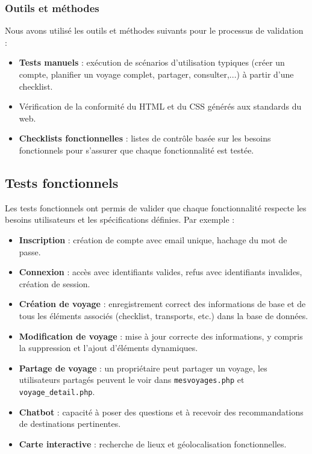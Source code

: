 \documentclass[a4paper,12pt]{article}
\begin{document}
\subsubsection{Outils et méthodes}
Nous avons utilisé les outils et méthodes suivants pour le processus de validation :
\begin{itemize}
  \item \textbf{Tests manuels} : exécution de scénarios d'utilisation typiques (créer un compte, planifier un voyage complet, partager, consulter,...) à partir d'une checklist.
  \item Vérification de la conformité du HTML et du CSS générés aux standards du web.
  \item \textbf{Checklists fonctionnelles} : listes de contrôle basée sur les besoins fonctionnels pour s'assurer que chaque fonctionnalité est testée.
\end{itemize}

\subsection{Tests fonctionnels}
Les tests fonctionnels ont permis de valider que chaque fonctionnalité respecte les besoins utilisateurs et les spécifications définies. Par exemple :
\begin{itemize}
    \item \textbf{Inscription} : création de compte avec email unique, hachage du mot de passe.
    \item \textbf{Connexion} : accès avec identifiants valides, refus avec identifiants invalides, création de session.
    \item \textbf{Création de voyage} : enregistrement correct des informations de base et de tous les éléments associés (checklist, transports, etc.) dans la base de données.
    \item \textbf{Modification de voyage} : mise à jour correcte des informations, y compris la suppression et l'ajout d'éléments dynamiques.
    \item \textbf{Partage de voyage} : un propriétaire peut partager un voyage, les utilisateurs partagés peuvent le voir dans \texttt{mesvoyages.php} et \texttt{voyage\_detail.php}.
    \item \textbf{Chatbot} : capacité à poser des questions et à recevoir des recommandations de destinations pertinentes.
    \item \textbf{Carte interactive} : recherche de lieux et géolocalisation fonctionnelles.
\end{itemize}
\end{document}
